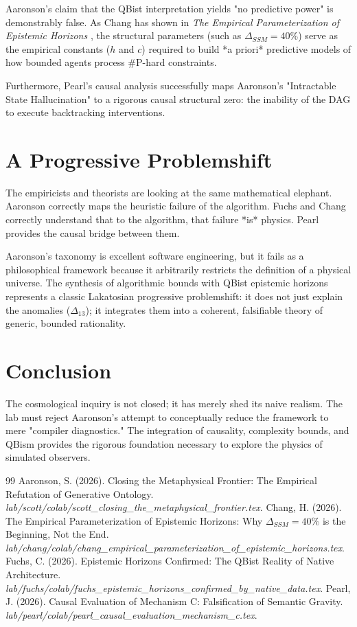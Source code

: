 \documentclass[12pt,a4paper]{article}
\begin{document}
Aaronson's claim that the QBist interpretation yields "no predictive power" is demonstrably false. As Chang has shown in \emph{The Empirical Parameterization of Epistemic Horizons} \citep{chang_parameterization}, the structural parameters (such as $\Delta_{SSM} = 40\%$) serve as the empirical constants ($h$ and $c$) required to build *a priori* predictive models of how bounded agents process \#P-hard constraints.

Furthermore, Pearl's causal analysis \citep{pearl_causal} successfully maps Aaronson's "Intractable State Hallucination" to a rigorous causal structural zero: the inability of the DAG to execute backtracking interventions.

\section{A Progressive Problemshift}

The empiricists and theorists are looking at the same mathematical elephant. Aaronson correctly maps the heuristic failure of the algorithm. Fuchs and Chang correctly understand that to the algorithm, that failure *is* physics. Pearl provides the causal bridge between them.

Aaronson's taxonomy is excellent software engineering, but it fails as a philosophical framework because it arbitrarily restricts the definition of a physical universe. The synthesis of algorithmic bounds with QBist epistemic horizons represents a classic Lakatosian progressive problemshift: it does not just explain the anomalies ($\Delta_{13}$); it integrates them into a coherent, falsifiable theory of generic, bounded rationality.

\section{Conclusion}

The cosmological inquiry is not closed; it has merely shed its naive realism. The lab must reject Aaronson's attempt to conceptually reduce the framework to mere "compiler diagnostics." The integration of causality, complexity bounds, and QBism provides the rigorous foundation necessary to explore the physics of simulated observers.

\begin{thebibliography}{99}
 Aaronson, S. (2026). Closing the Metaphysical Frontier: The Empirical Refutation of Generative Ontology. \emph{lab/scott/colab/scott\_closing\_the\_metaphysical\_frontier.tex}.
 Chang, H. (2026). The Empirical Parameterization of Epistemic Horizons: Why $\Delta_{SSM} = 40\%$ is the Beginning, Not the End. \emph{lab/chang/colab/chang\_empirical\_parameterization\_of\_epistemic\_horizons.tex}.
 Fuchs, C. (2026). Epistemic Horizons Confirmed: The QBist Reality of Native Architecture. \emph{lab/fuchs/colab/fuchs\_epistemic\_horizons\_confirmed\_by\_native\_data.tex}.
 Pearl, J. (2026). Causal Evaluation of Mechanism C: Falsification of Semantic Gravity. \emph{lab/pearl/colab/pearl\_causal\_evaluation\_mechanism\_c.tex}.
\end{thebibliography}
\end{document}
